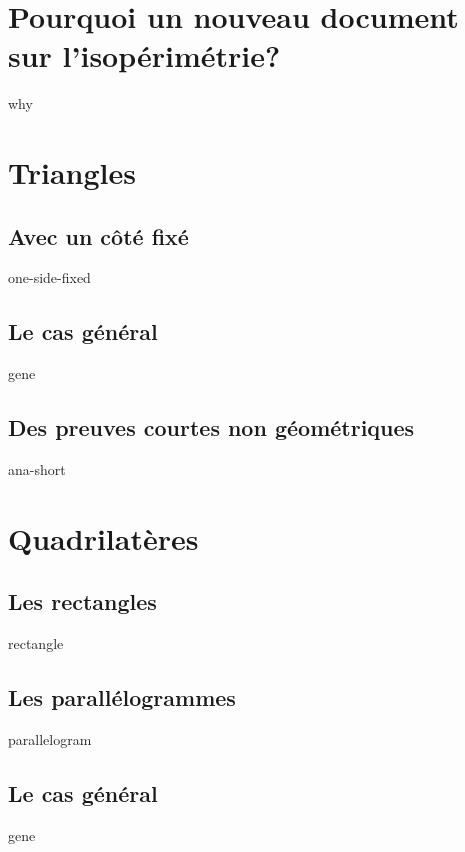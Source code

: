 \documentclass[12pt]{amsart}
\begin{document}


\section{Pourquoi un  nouveau document sur l'isopérimétrie?}
{why}




\section{Triangles}

\subsection{Avec un côté fixé}
{one-side-fixed}


\subsection{Le cas général}
{gene}


\subsection{Des preuves courtes non géométriques}
{ana-short}




\section{Quadrilatères}

\subsection{Les rectangles}
{rectangle}


\subsection{Les parallélogrammes}
{parallelogram}


\subsection{Le cas général}
{gene}
\end{document}
